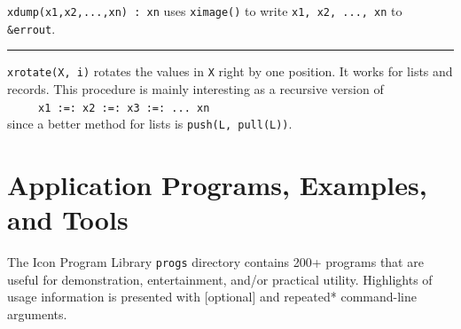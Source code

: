 \texttt{xdump(x1,x2,...,xn) : xn} uses \texttt{ximage()} to
write \texttt{x1, x2, ..., xn} to \texttt{\&errout}.





\vspace{0.25cm}\hrule{}

\texttt{xrotate(X, i)} rotates the values in \texttt{X} right by one
position. It works for lists and records. This procedure is mainly
interesting as a recursive version of\\
 \ \ \ \ \ \texttt{x1 :=: x2 :=: x3 :=: ... xn}\\
\noindent since a better method for lists is \texttt{push(L, pull(L))}. 


\section{Application Programs, Examples, and Tools}

The Icon Program Library \texttt{progs} directory contains 200+ programs that
are useful for demonstration, entertainment, and/or practical utility.
Highlights of usage information is presented with [optional] and repeated*
command-line arguments.

